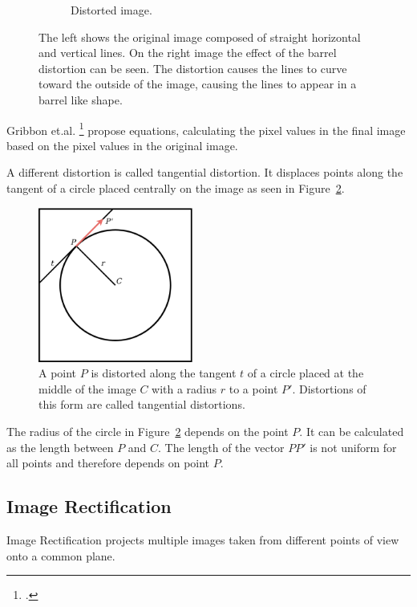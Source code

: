 \begin{figure}[h!]
\begin{subfigure}[t]{0.3\textwidth}
		\caption{Distorted image.}
	\end{subfigure}
	\caption{The left shows the original image composed of straight horizontal and vertical lines. On the right image the effect of the barrel distortion can be seen. The distortion causes the lines to curve toward the outside of the image, causing the lines to appear in a barrel like shape.}
	\label{pic:methodology_stereoCamera_distortion_barrelDistortion}
\end{figure}

Gribbon et.al. \footcite{Gribbon_Barrel_Distortion_Correction_Algorithm} propose equations, calculating the pixel values in the final image based on the pixel values in the original image.

A different distortion is called tangential distortion. It displaces points along the tangent of a circle placed centrally on the image as seen in Figure~\ref{pic:methodology_stereoCamera_distortion_tangentialDistortion}.

\begin{figure}[h!]
	\centering
	\includegraphics[width=2in]{img/methodology_stereoCamera_distortion_tangentialDistortion.png}
	\caption{A point $P$ is distorted along the tangent $t$ of a circle placed at the middle of the image $C$ with a radius $r$ to a point $P'$. Distortions of this form are called tangential distortions.}
	\label{pic:methodology_stereoCamera_distortion_tangentialDistortion}
\end{figure}

The radius of the circle in Figure~\ref{pic:methodology_stereoCamera_distortion_tangentialDistortion} depends on the point $P$. It can be calculated as the length between $P$ and $C$. The length of the vector $PP'$ is not uniform for all points and therefore depends on point $P$.

\subsection{Image Rectification}
Image Rectification projects multiple images taken from different points of view onto a common plane. 

